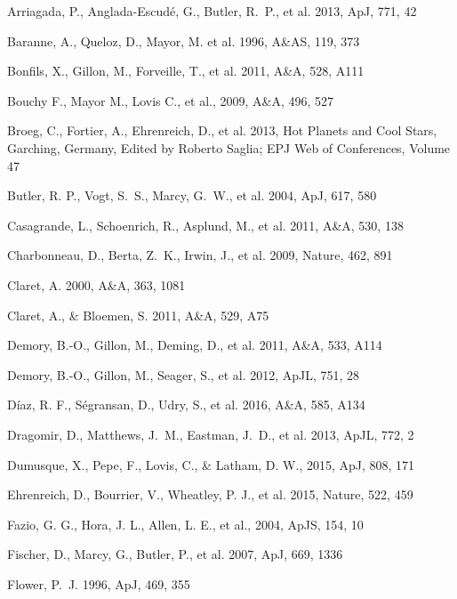 \documentclass[traditabstract]{aa}
\begin{document}
\begin{thebibliography}{}

 Arriagada, P., Anglada-Escud\'e, G., Butler, R.~P., et al. 2013, ApJ, 771, 42
   
 Baranne, A., Queloz, D., Mayor, M. et al. 1996, A\&AS, 119, 373

 Bonfils, X., Gillon, M., Forveille, T., et al. 2011, A\&A, 528, A111

 Bouchy F., Mayor M., Lovis C., et al., 2009, A\&A, 496, 527

 Broeg, C., Fortier, A., Ehrenreich, D., et al. 2013, Hot Planets and Cool Stars, Garching, Germany, Edited by Roberto Saglia; EPJ Web of Conferences, Volume 47

 Butler, R. P., Vogt, S.~S., Marcy, G.~W., et al. 2004, ApJ, 617, 580

 Casagrande, L., Schoenrich, R., Asplund, M., et al. 2011, A\&A, 530, 138

 Charbonneau, D., Berta, Z.~K., Irwin, J., et al. 2009, Nature, 462, 891
   
 Claret, A. 2000, A\&A, 363, 1081
   
 Claret, A., \& Bloemen, S. 2011, A\&A, 529, A75

 Demory, B.-O., Gillon, M., Deming, D., et al. 2011, A\&A, 533, A114

 Demory, B.-O., Gillon, M., Seager, S., et al. 2012, ApJL, 751, 28
   
 D\'iaz, R. F., S\'egransan, D., Udry, S., et al. 2016, A\&A, 585, A134
   
 Dragomir, D., Matthews, J.~M., Eastman, J.~D., et al. 2013, ApJL, 772, 2
   
 Dumusque, X., Pepe, F., Lovis, C., \& Latham, D. W., 2015, ApJ, 808, 171

 Ehrenreich, D., Bourrier, V., Wheatley, P. J., et al. 2015, Nature, 522, 459

 Fazio, G. G., Hora, J. L., Allen, L. E.,  et al., 2004, ApJS, 154, 10
   
 Fischer, D., Marcy, G., Butler, P., et al. 2007, ApJ, 669, 1336

 Flower, P.~J. 1996, ApJ, 469, 355


\end{thebibliography}
\end{document}
